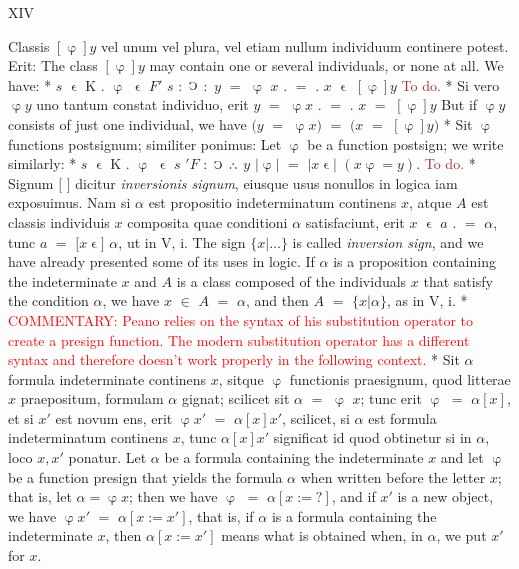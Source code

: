 \documentclass{book}
\newcommand{\s}{\switchcolumn} %
\newcommand{\C}{\mathop{\sbox0{$\displaystyle$$\reflectbox{C}$} %
\raisebox{-\height+\ht0-0.05cm}[\ht0][\dp0]{\scalebox{0.8}[0.8]{\copy0}}}\displaylimits} %
\newcommand{\pppNoSpace}{\leavevmode\lower0ex\hbox{.}\kern-0.1em\raise0.7ex\hbox{.}\kern-0.1em\lower0ex\hbox{.}} %
\newcommand{\smallIn}{\ensuremath{\mathrel{\epsilon}}}
\newcommand\commentary[1]{\textcolor{red}{COMMENTARY: #1}}
\newcommand\todo{\textcolor{brown}{To do.}}
\newcommand{\peanoPage}[1]{\vspace{1ex}

  \columnratio{0.475, 0.05, 0.475} \begin{paracol}{3} \centering \hdashrule{\columnwidth}{0.1mm}{0.1mm 1mm} \s #1 \s \hdashrule{\columnwidth}{0.1mm}{0.1mm 1mm} \end{paracol}

\vspace{1ex}}
\newenvironment{translateTwoCol}
               { %
                 \columnratio{0.5, 0.5} \begin{paracol}{2}
                 \newcommand{\LAT}{\switchcolumn[0]*}
                 \newcommand{\ENG}{\switchcolumn[1]}
               }
               { %
                 \let\ENG\undefined
                 \let\LAT\undefined
                 \end{paracol}
               }
\begin{document}
\peanoPage{XIV} %

\begin{translateTwoCol}
Classis $[\upvarphi] y$ vel unum vel plura, vel etiam nullum individuum continere potest. Erit:
\ENG
The class $[\upvarphi] y$ may contain one or several individuals, or none at all. We have:
\LAT
\hspace{1.06cm} $s$ $\smallIn$ K $.$ $\upvarphi$ $\smallIn$ $F'$ $s$ $:$ $\C$ $:$ $y$ $=$ $\upvarphi$ $x$ $.$ $=$ $.$ $x$ $\smallIn$ $[\upvarphi] y$
\ENG
\todo
\LAT
Si vero $\upvarphi y$ uno tantum constat individuo, erit $y$ $=$ $\upvarphi x$ $.$ $=$ $.$ $x$ $=$ $[\upvarphi] y$
\ENG
But if $\upvarphi y$ consists of just one individual, we have $(y$ $=$ $\upvarphi x)$ $=$ $(x$ $=$ $[\upvarphi] y)$
\LAT
Sit $\upvarphi$ functions postsignum; similiter ponimus:
\ENG
Let $\upvarphi$ be a function postsign; we write similarly:
\LAT
\hspace{1.06cm} $s$ $\smallIn$ K $.$ $\upvarphi$ $\smallIn$ $s$ $'F$ $:$ $\C$ $\pppNoSpace$ $y$ $| \upvarphi |$ $=$ $| x\smallIn |$ $(x \upvarphi = y)$.
\ENG
\todo
\LAT
Signum $[$ $]$ dicitur \emph{inversionis signum}, eiusque usus nonullos in logica iam exposuimus. Nam si $\alpha$ est propositio indeterminatum continens $x$, atque $A$ est classis individuis $x$ composita quae conditioni $\alpha$ satisfaciunt, erit $x$ $\smallIn$ $a$ $.$ $=$ $\alpha$, tunc $a$ $=$ $[x$\smallIn$]$ $\alpha$, ut in V, i.
\ENG
The sign $\{ x | \ldots \}$ is called \emph{inversion sign}, and we have already presented some of its uses in logic. If $\alpha$ is a proposition containing the indeterminate $x$ and $A$ is a class composed of the individuals $x$ that satisfy the condition $\alpha$, we have $x$ $\in$ $A$ $=$ $\alpha$, and then $A$ $=$ $\{ x | \alpha \}$, as in V, i.
\LAT
\ENG
\commentary{Peano relies on the syntax of his substitution operator to create a presign function.  The modern substitution operator has a different syntax and therefore doesn't work properly in the following context.}
\LAT
Sit $\alpha$ formula indeterminate continens $x$, sitque $\upvarphi$ functionis praesignum, quod litterae $x$ praepositum, formulam $\alpha$ gignat; scilicet sit $\alpha$ $=$ $\upvarphi$ $x$; tunc erit $\upvarphi$ $=$ $\alpha [x]$, et si $x'$ est novum ens, erit $\upvarphi x'$ $=$ $\alpha [x] x'$, scilicet, si $\alpha$ est formula indeterminatum continens $x$, tunc $\alpha [x] x'$ significat id quod obtinetur si in $\alpha$, loco $x, x'$ ponatur.
\ENG
Let $\alpha$ be a formula containing the indeterminate $x$ and let $\upvarphi$ be a function presign that yields the formula $\alpha$ when written before the letter $x$; that is, let $\alpha = \upvarphi x$; then we have $\upvarphi$ $=$ $\alpha [x := ? ]$, and if $x'$ is a new object, we have $\upvarphi x'$ $=$ $\alpha [x := x']$, that is, if $\alpha$ is a formula containing the indeterminate $x$, then $\alpha[x := x']$ means what is obtained when, in $\alpha$, we put $x'$ for $x$.

\end{translateTwoCol}
\end{document}
